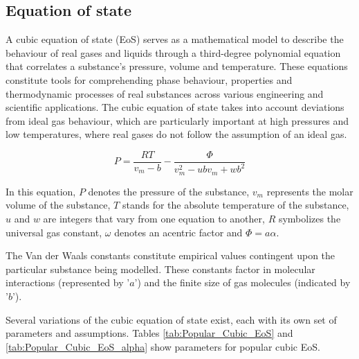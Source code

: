 \documentclass[../Article_Model_Parameters.tex]{subfiles}
\begin{document}
	
	\label{CH: Thermodynamic_details}
	
	\subsection{Equation of state} \label{subsubsec: Equation of state}
	
	A cubic equation of state (EoS) serves as a mathematical model to describe the behaviour of real gases and liquids through a third-degree polynomial equation that correlates a substance's pressure, volume and temperature. These equations constitute tools for comprehending phase behaviour, properties and thermodynamic processes of real substances across various engineering and scientific applications. The cubic equation of state takes into account deviations from ideal gas behaviour, which are particularly important at high pressures and low temperatures, where real gases do not follow the assumption of an ideal gas.
	
	{\footnotesize
	\begin{equation}
		P = \frac{RT}{v_m-b} - \frac{\Phi}{v_m^2 - ubv_m + wb^2}
	\end{equation}
	}
	
	In this equation, $P$ denotes the pressure of the substance, $v_m$ represents the molar volume of the substance, $T$ stands for the absolute temperature of the substance, $u$ and $w$ are integers that vary from one equation to another, $R$ symbolizes the universal gas constant, $\omega$ denotes an acentric factor and $\Phi=a\alpha$.
	
	The Van der Waals constants constitute empirical values contingent upon the particular substance being modelled. These constants factor in molecular interactions (represented by '$a$') and the finite size of gas molecules (indicated by '$b$'). 
	
	Several variations of the cubic equation of state exist, each with its own set of parameters and assumptions. Tables \ref{tab:Popular_Cubic_EoS} and \ref{tab:Popular_Cubic_EoS_alpha} show parameters for popular cubic EoS.
	
	\begin{table}[h!]
		\centering
		\caption{Parameters for Popular Cubic EoS.}
		\label{tab:Popular_Cubic_EoS}
	\end{table}
	
\end{document}
